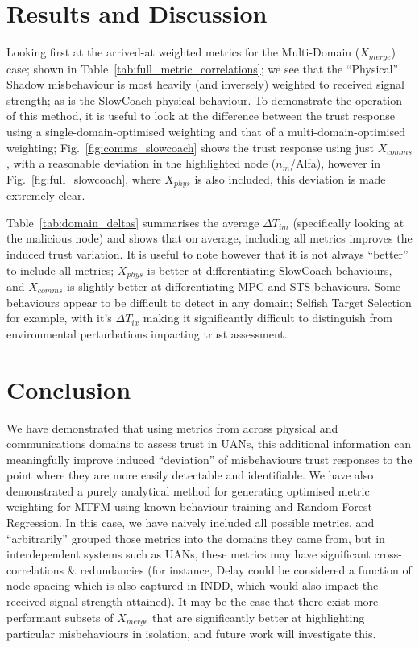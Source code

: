 \documentclass[conference]{IEEEtran}
\begin{document}
\section{Results and Discussion}\label{sec:results}
Looking first at the arrived-at weighted metrics for the Multi-Domain ($X_{merge}$) case; shown in Table~\ref{tab:full_metric_correlations}; we see that the ``Physical'' Shadow misbehaviour is most heavily (and inversely) weighted to received signal strength; as is the SlowCoach physical behaviour. 
To demonstrate the operation of this method, it is useful to look at the difference between the trust response using a single-domain-optimised weighting and that of a multi-domain-optimised weighting; Fig.~\ref{fig:comms_slowcoach} shows the trust response using just $X_{comms}$, with a reasonable deviation in the highlighted node ($n_m$/Alfa), however in Fig.~\ref{fig:full_slowcoach}, where $X_{phys}$ is also included, this deviation is made extremely clear.

Table~\ref{tab:domain_deltas} summarises the average $\Delta T_{im}$ (specifically looking at the malicious node) and shows that on average, including all metrics improves the induced trust variation. 
It is useful to note however that it is not always ``better'' to include all metrics; $X_{phys}$ is better at differentiating SlowCoach behaviours, and $X_{comms}$ is slightly better at differentiating MPC and STS behaviours.
Some behaviours appear to be difficult to detect in any domain; Selfish Target Selection for example, with it's $\Delta T_{ix}$ making it significantly difficult to distinguish from environmental perturbations impacting trust assessment.



\section{Conclusion}
We have demonstrated that using metrics from across physical and communications domains to assess trust in UANs, this additional information can meaningfully improve induced ``deviation'' of misbehaviours trust responses to the point where they are more easily detectable and identifiable.
We have also demonstrated a purely analytical method for generating optimised metric weighting for MTFM using known behaviour training and Random Forest Regression.
In this case, we have naively included all possible metrics, and ``arbitrarily'' grouped those metrics into the domains they came from, but in interdependent systems such as UANs, these metrics may have significant cross-correlations \& redundancies (for instance, Delay could be considered a function of node spacing which is also captured in INDD, which would also impact the received signal strength attained).
It may be the case that there exist more performant subsets of $X_{merge}$ that are significantly better at highlighting particular misbehaviours in isolation, and future work will investigate this.
\end{document}
